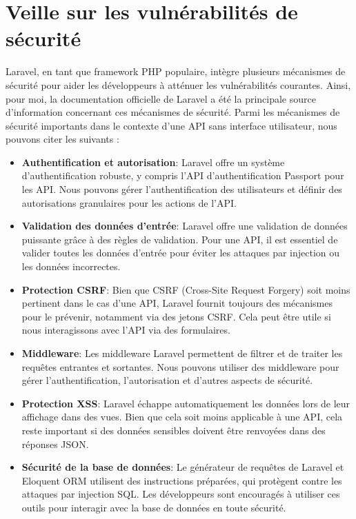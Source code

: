 \chapter{Veille sur les vulnérabilités de sécurité}\label{ch:veille-vulnerabilites-securite}

Laravel, en tant que framework PHP populaire, intègre plusieurs mécanismes de sécurité pour aider les développeurs à atténuer les vulnérabilités courantes. Ainsi, pour moi, la documentation officielle de Laravel a été la principale source d'information concernant ces mécanismes de sécurité. Parmi les mécanismes de sécurité importants dans le contexte d'une API sans interface utilisateur, nous pouvons citer les suivants :

\begin{itemize}
    \item \textbf{Authentification et autorisation}: Laravel offre un système d'authentification robuste, y compris l'API d'authentification Passport pour les API. Nous pouvons gérer l'authentification des utilisateurs et définir des autorisations granulaires pour les actions de l'API.
    \item \textbf{Validation des données d'entrée}: Laravel offre une validation de données puissante grâce à des règles de validation. Pour une API, il est essentiel de valider toutes les données d'entrée pour éviter les attaques par injection ou les données incorrectes.
    \item \textbf{Protection CSRF}: Bien que CSRF (Cross-Site Request Forgery) soit moins pertinent dans le cas d'une API, Laravel fournit toujours des mécanismes pour le prévenir, notamment via des jetons CSRF. Cela peut être utile si nous interagissons avec l'API via des formulaires.
    \item \textbf{Middleware}: Les middleware Laravel permettent de filtrer et de traiter les requêtes entrantes et sortantes. Nous pouvons utiliser des middleware pour gérer l'authentification, l'autorisation et d'autres aspects de sécurité.
    \item \textbf{Protection XSS}: Laravel échappe automatiquement les données lors de leur affichage dans des vues. Bien que cela soit moins applicable à une API, cela reste important si des données sensibles doivent être renvoyées dans des réponses JSON.
    \item \textbf{Sécurité de la base de données}: Le générateur de requêtes de Laravel et Eloquent ORM utilisent des instructions préparées, qui protègent contre les attaques par injection SQL. Les développeurs sont encouragés à utiliser ces outils pour interagir avec la base de données en toute sécurité.

\end{itemize}
